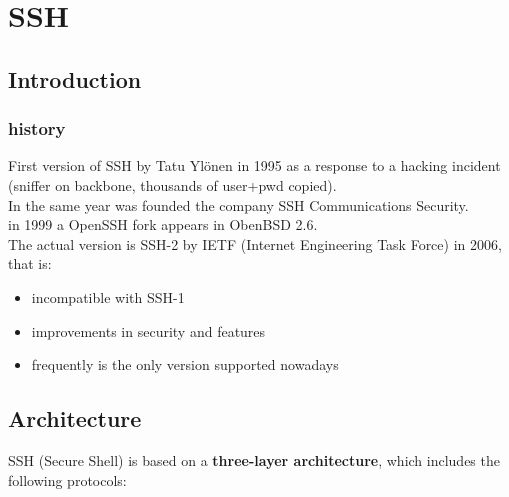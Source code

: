 
\chapter{SSH}

\section{Introduction}



\subsection{history}
First version of SSH by Tatu Ylönen in 1995 as a response to a hacking incident (sniffer on backbone, thousands of user+pwd copied). \\ In the same year was founded the company SSH Communications Security. \\ in 1999 a OpenSSH fork appears in ObenBSD 2.6. \\
The actual version is SSH-2 by IETF (Internet Engineering Task Force) in 2006, that is:
\begin{itemize}
    \item incompatible with SSH-1
    \item improvements in security and features
    \item frequently is the only version supported nowadays
\end{itemize}

\section{Architecture}
SSH (Secure Shell) is based on a \textbf{three-layer architecture}, which includes the following protocols:

